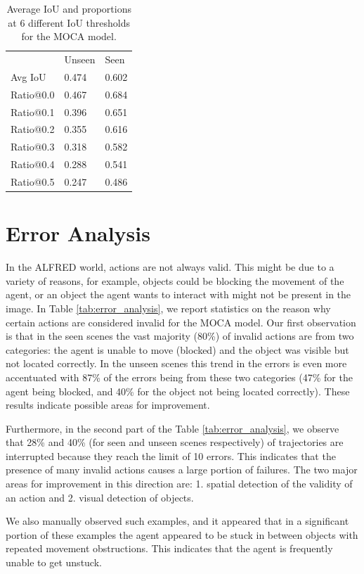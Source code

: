 \documentclass[11pt,a4paper]{article}
\begin{document}
\begin{table}[]
\centering
\begin{tabular}{lll}
        & Unseen & Seen  \\
Avg IoU & 0.474  & 0.602 \\
Ratio@0.0 & 0.467  & 0.684 \\
Ratio@0.1 & 0.396  & 0.651 \\
Ratio@0.2 & 0.355  & 0.616 \\
Ratio@0.3 & 0.318  & 0.582 \\
Ratio@0.4 & 0.288  & 0.541 \\
Ratio@0.5 & 0.247  & 0.486
\end{tabular}
\caption{Average IoU and proportions at 6 different IoU thresholds for the MOCA model.}
\label{tab:seg_acc}
\end{table}



\section{Error Analysis}
In the ALFRED world, actions are not always valid. This might be due to a variety of reasons, for example, objects could be blocking the movement of the agent, or an object the agent wants to interact with might not be present in the image.   
In Table \ref{tab:error_analysis}, we report statistics on the reason why certain actions are considered invalid for the MOCA model. Our first observation is that in the seen scenes  the vast majority (80\%) of invalid actions are from two categories: the agent is unable to move (blocked) and the object was visible but not located correctly. In the unseen scenes this trend in the errors is even more accentuated with   87\% of the errors being from these two categories  (47\% for the agent being blocked, and 40\% for the object not being located correctly). These results indicate possible areas for improvement.

Furthermore, in the second part of the Table \ref{tab:error_analysis}, we observe that 28\% and 40\% (for seen and unseen scenes respectively) of trajectories are interrupted because they reach the limit of 10 errors. This indicates that the presence of many invalid actions causes a large portion of failures. The two major areas for improvement in this direction are: 1. spatial detection of the validity of an action and 2. visual detection of objects.

We also manually observed such examples, and it appeared that in a significant portion of these examples the agent appeared to be stuck in between objects with repeated movement obstructions. This indicates that the agent is frequently unable to get unstuck. 
\end{document}

